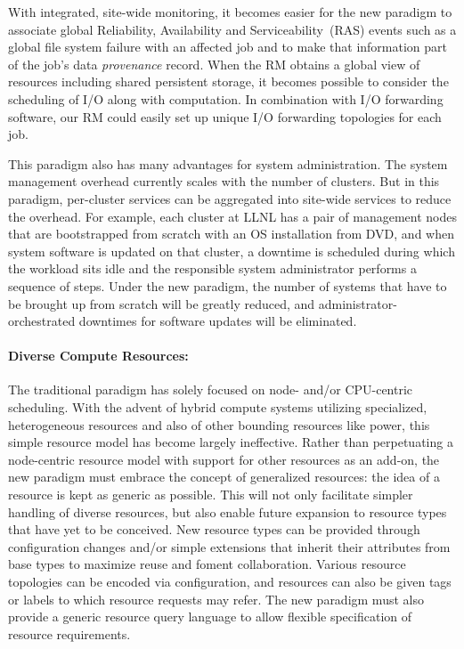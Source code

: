 \documentclass{article}
\begin{document}
With integrated, site-wide monitoring, it becomes easier
for the new paradigm to associate global Reliability, Availability and Serviceability~(RAS) 
events such as a global file system
failure with an affected job and to make that information part of
the job's data {\em provenance} record. When the RM obtains a global view of
resources including shared persistent storage, it becomes possible to
consider the scheduling of I/O along with computation. In combination with
I/O forwarding software, our RM could easily set up unique I/O forwarding
topologies for each job.

This paradigm also has many advantages for system administration.
The system management overhead currently scales with the number of clusters.
But in this paradigm, per-cluster services can be aggregated into
site-wide services to reduce the overhead.
For example, each cluster at LLNL has a pair of management
nodes that are bootstrapped from scratch with an OS installation from DVD,
and when system software is updated on that cluster, a downtime is
scheduled during which the workload sits idle and the responsible system
administrator performs a sequence of steps. Under the new paradigm, the
number of systems that have to be brought up from scratch will be
greatly reduced, and administrator-orchestrated downtimes for software
updates will be eliminated. 


\paragraph{Diverse Compute Resources:}
The traditional paradigm has solely focused on node- and/or CPU-centric
scheduling. With the advent of hybrid compute systems utilizing specialized,
heterogeneous resources and also of other bounding resources like power, 
this simple resource model has become largely ineffective. 
Rather than
perpetuating a node-centric resource model with support for other
resources as an add-on, the new paradigm must embrace the concept of generalized resources: 
the idea of a resource is kept as generic as possible. This will not only facilitate 
simpler handling of diverse resources, but also enable future expansion to resource types that have yet to
be conceived. New resource types can be provided through configuration changes
and/or simple extensions that inherit their attributes from base types 
to maximize reuse and foment collaboration. Various resource topologies
can be encoded via configuration, and resources can also be given tags or labels
to which resource requests may refer. 
The new paradigm must also provide a generic resource query language to allow flexible
specification of resource requirements.
\end{document}
